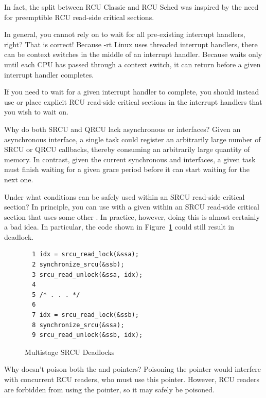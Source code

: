 	In fact, the split between RCU Classic and RCU Sched was inspired
	by the need for preemptible RCU read-side critical sections.

\QuickQ{}
	In general, you cannot rely on  to
	wait for all pre-existing interrupt handlers,
	right?
\QuickA{}
	That is correct!
	Because -rt Linux uses threaded interrupt handlers, there can
	be context switches in the middle of an interrupt handler.
	Because  waits only until each
	CPU has passed through a context switch, it can return
	before a given interrupt handler completes.

	If you need to wait for a given interrupt handler to complete,
	you should instead use  or place
	explicit RCU read-side critical sections in the interrupt
	handlers that you wish to wait on.

\QuickQ{}
	Why do both SRCU and QRCU lack asynchronous 
	or  interfaces?
\QuickA{}
	Given an asynchronous interface, a single task
	could register an arbitrarily large number of SRCU or QRCU callbacks,
	thereby consuming an arbitrarily large quantity of memory.
	In contrast, given the current synchronous
	 and 
	interfaces, a given task must finish waiting for a given grace period
	before it can start waiting for the next one.

\QuickQ{}
	Under what conditions can  be safely
	used within an SRCU read-side critical section?
\QuickA{}
	In principle, you can use
	 with a given 
	within an SRCU read-side critical section that uses some other
	.
	In practice, however, doing this is almost certainly a bad idea.
	In particular, the code shown in
	Figure~\ref{fig:defer:Multistage SRCU Deadlocks}
	could still result in deadlock.

\begin{figure}[htbp]
{ \centering
\begin{verbatim}
  1 idx = srcu_read_lock(&ssa);
  2 synchronize_srcu(&ssb);
  3 srcu_read_unlock(&ssa, idx);
  4
  5 /* . . . */
  6
  7 idx = srcu_read_lock(&ssb);
  8 synchronize_srcu(&ssa);
  9 srcu_read_unlock(&ssb, idx);
\end{verbatim}
}
\caption{Multistage SRCU Deadlocks}
\label{fig:defer:Multistage SRCU Deadlocks}
\end{figure}


\QuickQ{}
	Why doesn't  poison both the 
	and  pointers?
\QuickA{}
	Poisoning the  pointer would interfere
	with concurrent RCU readers, who must use this pointer.
	However, RCU readers are forbidden from using the 
	pointer, so it may safely be poisoned.


